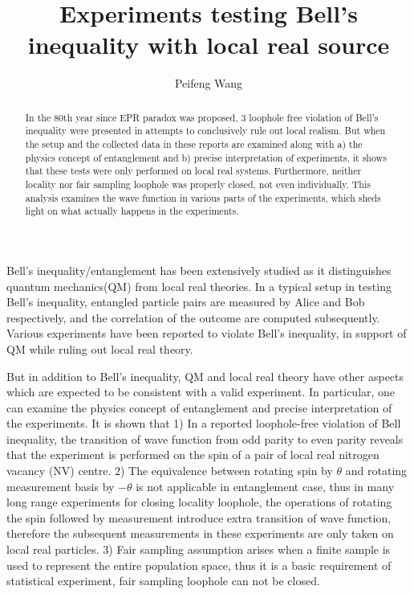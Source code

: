 \documentclass[prd,showpacs,twocolumn]{revtex4-1}
\begin{document}
\title{Experiments testing Bell's inequality with local real source}
\author{Peifeng Wang}
\address{Mijiaqiao 34-1-3-5, Xi'an, Shaanxi, P. R. China 710075}
\address{Guanghua Road 1\#, 34-1-3-5, Yanta District, Xi'an, Shaanxi, P. R. China 710075}
\begin{abstract}
In the 80th year since EPR paradox was proposed, 3 loophole free violation of Bell's inequality were presented in attempts to conclusively rule out local realism. But when the setup and the collected data in these reports are examined along with a) the physics concept of entanglement and b) precise interpretation of experiments, it shows that these tests were only performed on local real systems. Furthermore, neither locality nor fair sampling loophole was properly closed, not even individually. This analysis examines the wave function in various parts of the experiments, which sheds light on what actually happens in the experiments.
\end{abstract}
\maketitle

Bell's inequality\cite{Bell,CHSH}/entanglement has been extensively studied\cite{Aspect,Weihs, Rowe} as it distinguishes quantum mechanics(QM) from local real theories. In a typical setup in testing Bell's inequality, entangled particle pairs are measured by Alice and Bob respectively, and the correlation of the outcome are computed subsequently. Various experiments have been reported to violate Bell's inequality, in support of QM while ruling out local real theory.

But in addition to Bell's inequality, QM and local real theory have other aspects which are expected to be consistent with a valid experiment. In particular, one can examine the physics concept of entanglement and precise interpretation of the experiments. It is shown that 1) In a reported loophole-free violation of Bell inequality, the transition of wave function from odd parity to even parity reveals that the experiment is performed on the spin of a pair of local real nitrogen vacancy (NV) centre. 2) The equivalence between rotating spin by $\theta$ and rotating measurement basis by $-\theta$ is not applicable in entanglement case, thus in many long range experiments for closing locality loophole, the operations of rotating the spin followed by measurement introduce extra transition of wave function, therefore the subsequent measurements in these experiments are only taken on local real particles. 3) Fair sampling assumption arises when a finite sample is used to represent the entire population space, thus it is a basic requirement of statistical experiment, fair sampling loophole can not be closed.
\end{document}
